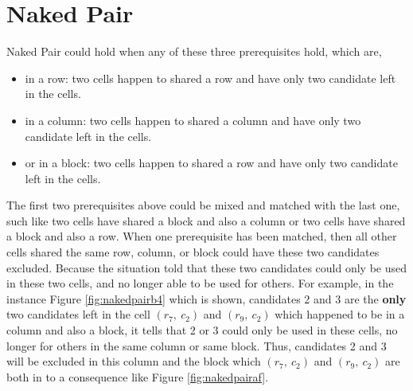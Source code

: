 \documentclass[11pt]{report}
\begin{document}
\section{Naked Pair}
\label{sec:Naked Pair}

Naked Pair could hold when any of these three prerequisites hold, which are, 
\begin{itemize}
\item in a row: two cells happen to shared a row and have only two candidate left in the cells.
\item in a column: two cells happen to shared a column and have only two candidate left in the cells.
\item or in a block: two cells happen to shared a row and have only two candidate left in the cells.
\end{itemize}
The first two prerequisites above could be mixed and matched with the last one, such like two cells have shared a block and also a column or two cells have shared a block and also a row. When one prerequisite has been matched, then all other cells shared the same row, column, or block could have these two candidates excluded. Because the situation told that these two candidates could only be used in these two cells, and no longer able to be used for others. For example, in the instance Figure \ref{fig:nakedpairb4} which is shown, candidates 2 and 3 are the \textbf{only} two candidates left in the cell $(r_{7},\ c_{2})$ and $(r_{9},\ c_{2})$ which happened to be in a column and also a block, it tells that 2 or 3 could only be used in these cells, no longer for others in the same column or same block. Thus, candidates 2 and 3 will be excluded in this column and the block which $(r_{7},\ c_{2})$ and $(r_{9},\ c_{2})$ are both in to a consequence like Figure \ref{fig:nakedpairaf}. 
\end{document}

